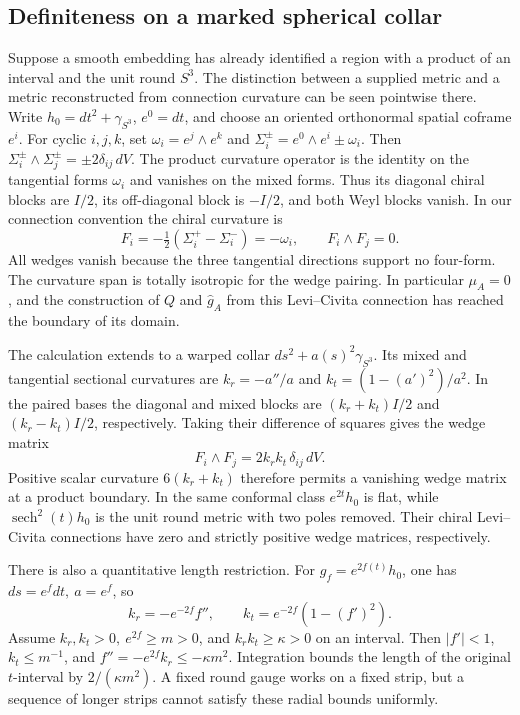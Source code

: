 \documentclass[11pt]{article}
\numberwithin{equation}{section}
\theoremstyle{definition}
\theoremstyle{remark}
\begin{document}
\subsection{Definiteness on a marked spherical collar}\label{sec:marked-product}

Suppose a smooth embedding has already identified a region with a
product of an interval and the unit round \(S^3\). The distinction
between a supplied metric and a metric reconstructed from connection
curvature can be seen pointwise there. Write \(h_0=dt^2+\gamma_{S^3}\),
\(e^0=dt\), and choose an oriented orthonormal spatial coframe \(e^i\).
For cyclic \(i,j,k\), set \(\omega_i=e^j\wedge e^k\) and
\(\Sigma_i^\pm=e^0\wedge e^i\pm\omega_i\). Then
\(\Sigma_i^\pm\wedge\Sigma_j^\pm=\pm2\delta_{ij}\,dV\). The product
curvature operator is the identity on the tangential forms \(\omega_i\)
and vanishes on the mixed forms. Thus its diagonal chiral blocks are
\(I/2\), its off-diagonal block is \(-I/2\), and both Weyl blocks
vanish. In our connection convention the chiral curvature is
\[
 F_i=-\tfrac12(\Sigma_i^+-\Sigma_i^-)=-\omega_i,\qquad
 F_i\wedge F_j=0 .
\]
All wedges vanish because the three tangential directions support no
four-form. The curvature span is totally isotropic for the wedge
pairing. In particular \(\mu_A=0\), and the construction of \(Q\) and
\(\widehat g_A\) from this Levi--Civita connection has reached the
boundary of its domain.

The calculation extends to a warped collar \(ds^2+a(s)^2\gamma_{S^3}\).
Its mixed and tangential sectional curvatures are
\(k_r=-a''/a\) and \(k_t=(1-(a')^2)/a^2\). In the paired bases the
diagonal and mixed blocks are \((k_r+k_t)I/2\) and
\((k_r-k_t)I/2\), respectively. Taking their difference of squares
gives the wedge matrix
\[
 F_i\wedge F_j=2k_rk_t\,\delta_{ij}\,dV .
\]
Positive scalar curvature \(6(k_r+k_t)\) therefore permits a vanishing
wedge matrix at a product boundary. In the same conformal class
\(e^{2t}h_0\) is flat, while \(\operatorname{sech}^2(t)h_0\) is the
unit round metric with two poles removed. Their chiral
Levi--Civita connections have zero and strictly positive wedge
matrices, respectively.

There is also a quantitative length restriction. For
\(g_f=e^{2f(t)}h_0\), one has \(ds=e^fdt,\ a=e^f\), so
\[
 k_r=-e^{-2f}f'',\qquad k_t=e^{-2f}(1-(f')^2).
\]
Assume \(k_r,k_t>0,\ e^{2f}\ge m>0\), and \(k_rk_t\ge\kappa>0\)
on an interval. Then \(|f'|<1\), \(k_t\le m^{-1}\), and
\(f''=-e^{2f}k_r\le-\kappa m^2\). Integration bounds the length of
the original \(t\)-interval by \(2/(\kappa m^2)\). A fixed round
gauge works on a fixed strip, but a sequence of longer strips cannot
satisfy these radial bounds uniformly.
\end{document}
